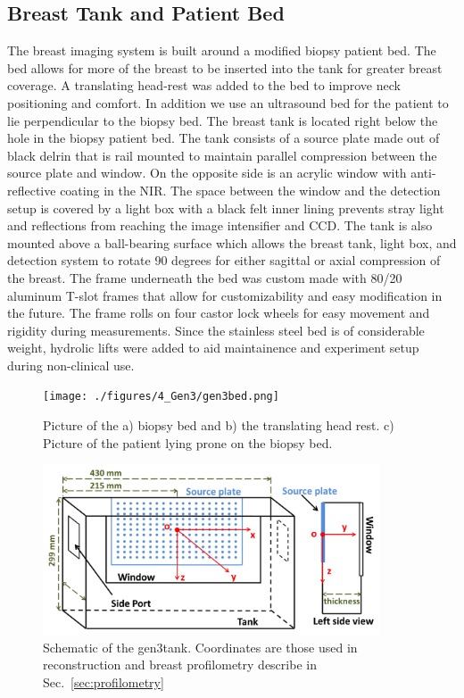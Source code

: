 \subsection{Breast Tank and Patient Bed}
The breast imaging system is built around a modified biopsy patient bed. The bed allows for more of the breast to be inserted into the tank for greater breast coverage. A translating head-rest was added to the bed to improve neck positioning and comfort. In addition we use an ultrasound bed for the patient to lie perpendicular to the biopsy bed. The breast tank is located right below the hole in the biopsy patient bed. The tank consists of a source plate made out of black delrin that is rail mounted to maintain parallel compression between the source plate and window. On the opposite side is an acrylic window with anti-reflective coating in the NIR. The space between the window and the detection setup is covered by a light box with a black felt inner lining prevents stray light and reflections from reaching the image intensifier and CCD. The tank is also mounted above a ball-bearing surface which allows the breast tank, light box, and detection system to rotate 90 degrees for either sagittal or axial compression of the breast. The frame underneath the bed was custom made with 80/20 aluminum T-slot frames that allow for customizability and easy modification in the future. The frame rolls on four castor lock wheels for easy movement and rigidity during measurements. Since the stainless steel bed is of considerable weight, hydrolic lifts were added to aid maintainence and experiment setup during non-clinical use.
\begin{figure}[ht]
\centering
\texttt{[image: ./figures/4\_Gen3/gen3bed.png]}
\caption{ Picture of the a) biopsy bed and b) the translating head rest. c) Picture of the patient lying prone on the biopsy bed.}
\label{fig:gen3bed}
\end{figure}
\begin{figure}[ht]
\centering
\includegraphics[width=10cm]{./figures/4_Gen3/gen3tank.png}
\caption{Schematic of the gen3tank. Coordinates are those used in reconstruction and breast profilometry describe in Sec.~\ref{sec:profilometry}}
\label{fig:laserpic}
\end{figure}

